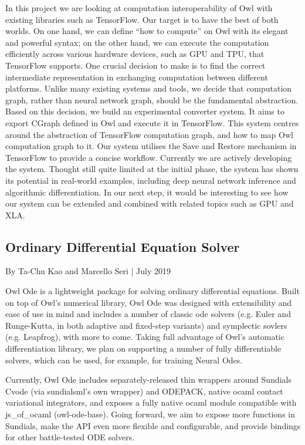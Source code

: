 In this project we are looking at computation interoperability of Owl with existing libraries such as TensorFlow. Our target is to have the best of both worlds. On one hand, we can define “how to compute” on Owl with its elegant and powerful syntax; on the other hand, we can execute the computation efficiently across various hardware devices, such as GPU and TPU, that TensorFlow supports. One crucial decision to make is to find the correct intermediate representation in exchanging computation between different platforms. Unlike many existing systems and tools, we decide that computation graph, rather than neural network graph, should be the fundamental abstraction. Based on this decision, we build an experimental converter system. It aims to export CGraph defined in Owl and execute it in TensorFlow. This system centres around the abstraction of TensorFlow computation graph, and how to map Owl computation graph to it. Our system utilises the Save and Restore mechanism in TensorFlow to provide a concise workflow. Currently we are actively developing the system. Thought still quite limited at the initial phase, the system has shown its potential in real-world examples, including deep neural network inference and algorithmic differentiation. In our next step, it would be interesting to see how our system can be extended and combined with related topics such as GPU and XLA.


\hypertarget{Ordinary Differential Equation Solver}{%
\subsection{Ordinary Differential Equation Solver}\label{theses-owlde}}

By Ta-Chu Kao and Marcello Seri | July 2019

Owl Ode is a lightweight package for solving ordinary differential equations. Built on top of Owl's numerical library, Owl Ode was designed with extensibility and ease of use in mind and includes a number of classic ode solvers (e.g. Euler and Runge-Kutta, in both adaptive and fixed-step variants) and symplectic sovlers (e.g. Leapfrog), with more to come. Taking full advantage of Owl's automatic differentiation library, we plan on supporting a number of fully differentiable solvers, which can be used, for example, for training Neural Odes.

Currently, Owl Ode includes separately-released thin wrappers around Sundials Cvode (via sundialsml's own wrapper) and ODEPACK, native ocaml contact variational integrators, and exposes a fully native ocaml module compatible with js\_of\_ocaml (owl-ode-base). Going forward, we aim to expose more functions in Sundials, make the API even more flexible and configurable, and provide bindings for other battle-tested ODE solvers.

